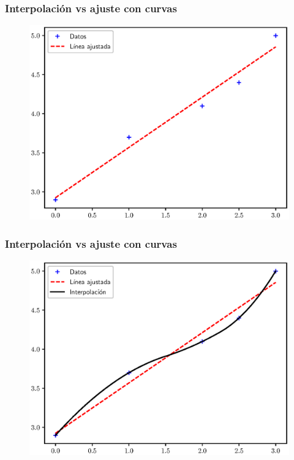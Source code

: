 \documentclass[12pt]{beamer}
\begin{document}
\begin{frame}[fragile]
\frametitle{Interpolación vs ajuste con curvas}
\begin{figure}
    \centering
    \includegraphics[scale=0.6]{Imagenes/Intro_Interpolacion_002.eps}
\end{figure}
\end{frame}
\begin{frame}[fragile]
\frametitle{Interpolación vs ajuste con curvas}
\begin{figure}
    \centering
    \includegraphics[scale=0.6]{Imagenes/Intro_Interpolacion_003.eps}
\end{figure}
\end{frame}
\end{document}
